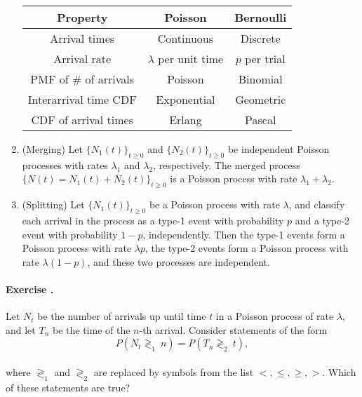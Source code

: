 \documentclass[twocolumn,12pt,a4paper]{article}
\newcounter{num}  %
\begin{document}
\begin{enumerate}
	\hspace{-1.1cm}
	\begin{tabular}{|c|c|c|}
		\hline
		\textbf{Property} & \textbf{Poisson} & \textbf{Bernoulli} \\
		\hline
		Arrival times & Continuous & Discrete \\
		\hline
		Arrival rate & \( \lambda \) per unit time & \( p \) per trial \\
		\hline
		PMF of \# of arrivals & Poisson & Binomial \\
		\hline
		Interarrival time CDF & Exponential & Geometric \\
		\hline
		CDF of arrival times & Erlang & Pascal \\
		\hline
	\end{tabular}
	
	\item (Merging) Let $\{N_1(t)\}_{t \geq 0}$ and $\{N_2(t)\}_{t \geq 0}$ be independent Poisson processes with rates $\lambda_1$ and $\lambda_2$, respectively. 
	The merged process $\{N (t) = N_1(t) + N_2(t)\}_{t \geq 0}$ is a Poisson process with rate $\lambda_1+\lambda_2$.
	
	\item (Splitting) Let $\{N_1(t)\}_{t \geq 0}$ be a Poisson process with rate
	$\lambda$, and classify each arrival in the process as a type-1 event with probability $p$ and a type-2 event with probability $1 - p$, independently. 
	Then the type-1 events form a Poisson process with rate $\lambda p$, the type-2 events form a Poisson process with rate
	$\lambda (1-p)$, and these two processes are independent.
	\end{enumerate}


 
	\paragraph{Exercise \thenum.}
	Let $N_t$ be the number of arrivals up until time $t$ in a Poisson process of rate $\lambda$, and let $T_n$ be the time of the $n$-th arrival. Consider statements of the form
	\[
	P(N_t  \gtrless_1 \ n) = P(T_n \gtrless_2 \ t),
	\]\\
	where $\gtrless_1$ and $\gtrless_2$ are replaced by symbols from the list $<, \leq, \geq, >$. Which of these statements are true?
	
\end{document}

